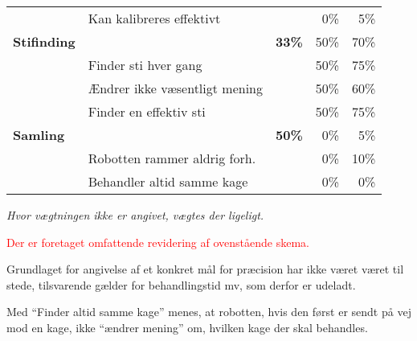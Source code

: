 \begin{footnotesize}
\begin{center}
\begin{tabular}{l | l | r r r}
	& Kan kalibreres effektivt & & 0\% & 5\% \\
	\hspace*{0.3cm}\hspace*{0.3cm} \textbf{Stifinding}
																&		&	\textbf{33\%} & 	50\% & 70\% \\
	& Finder sti hver gang & & 50\% & 75\% \\
	& Ændrer ikke væsentligt mening & & 50\% & 60\% \\
	& Finder en effektiv sti & & 50\% & 75\% \\
	\hspace*{0.3cm} \textbf{Samling}
																&		&\textbf{50\%}		& 	0\%	& 5\% \\
	& Robotten rammer aldrig forh. & & 0\% & 10\% \\
	& Behandler altid samme kage & & 0\% & 0\%
\end{tabular}
\end{center}
\end{footnotesize}
\textit{Hvor vægtningen ikke er angivet, vægtes der ligeligt.}

\textcolor{red}{Der er foretaget omfattende revidering af ovenstående skema.}

Grundlaget for angivelse af et konkret mål for præcision har ikke været  været til stede, tilsvarende gælder for behandlingstid mv, som derfor er udeladt.

Med "`Finder altid samme kage"' menes, at robotten, hvis den først er sendt på vej mod en kage, ikke "`ændrer mening"' om, hvilken kage der skal behandles.